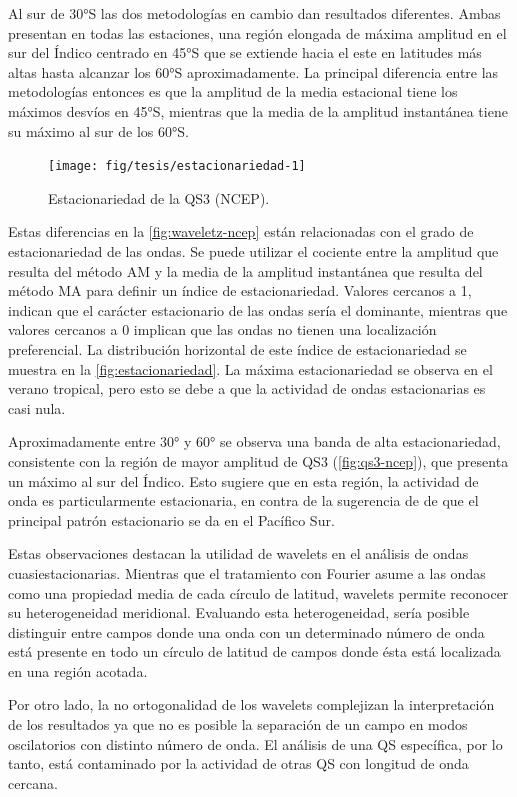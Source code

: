 \documentclass[spanish,a4paper,12pt,oneside]{book}
\begin{document}
Al sur de 30°S las dos metodologías en cambio dan resultados diferentes.
Ambas presentan en todas las estaciones, una región elongada de máxima
amplitud en el sur del Índico centrado en 45°S que se extiende hacia el
este en latitudes más altas hasta alcanzar los 60°S aproximadamente. La
principal diferencia entre las metodologías entonces es que la amplitud
de la media estacional tiene los máximos desvíos en 45°S, mientras que
la media de la amplitud instantánea tiene su máximo al sur de los 60°S.

\begin{figure}
\texttt{[image: fig/tesis/estacionariedad-1]} \caption{Estacionariedad de la QS3 (NCEP).}\label{fig:estacionariedad}
\end{figure}

Estas diferencias en la \autoref{fig:waveletz-ncep} están relacionadas
con el grado de estacionariedad de las ondas. Se puede utilizar el
cociente entre la amplitud que resulta del método AM y la media de la
amplitud instantánea que resulta del método MA para definir un índice de
estacionariedad. Valores cercanos a 1, indican que el carácter
estacionario de las ondas sería el dominante, mientras que valores
cercanos a 0 implican que las ondas no tienen una localización
preferencial. La distribución horizontal de este índice de
estacionariedad se muestra en la \autoref{fig:estacionariedad}. La
máxima estacionariedad se observa en el verano tropical, pero esto se
debe a que la actividad de ondas estacionarias es casi nula.

Aproximadamente entre 30° y 60° se observa una banda de alta
estacionariedad, consistente con la región de mayor amplitud de QS3
(\autoref{fig:qs3-ncep}), que presenta un máximo al sur del Índico. Esto
sugiere que en esta región, la actividad de onda es particularmente
estacionaria, en contra de la sugerencia de \citet{Hobbs2010} de que el
principal patrón estacionario se da en el Pacífico Sur.

Estas observaciones destacan la utilidad de wavelets en el análisis de
ondas cuasiestacionarias. Mientras que el tratamiento con Fourier asume
a las ondas como una propiedad media de cada círculo de latitud,
wavelets permite reconocer su heterogeneidad meridional. Evaluando esta
heterogeneidad, sería posible distinguir entre campos donde una onda con
un determinado número de onda está presente en todo un círculo de
latitud de campos donde ésta está localizada en una región acotada.

Por otro lado, la no ortogonalidad de los wavelets complejizan la
interpretación de los resultados ya que no es posible la separación de
un campo en modos oscilatorios con distinto número de onda. El análisis
de una QS específica, por lo tanto, está contaminado por la actividad de
otras QS con longitud de onda cercana.
\end{document}
